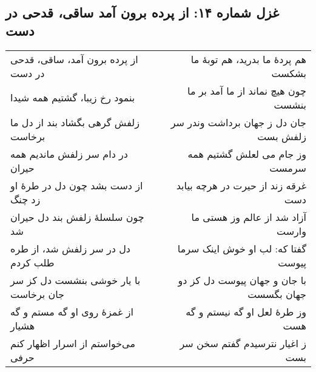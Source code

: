 \begin{center}
\section*{غزل شماره ۱۴: از پرده برون آمد ساقی، قدحی در دست}
\label{sec:014}
\begin{longtable}{l p{0.5cm} r}
از پرده برون آمد، ساقی، قدحی در دست
&&
هم پردهٔ ما بدرید، هم توبهٔ ما بشکست
\\
بنمود رخ زیبا، گشتیم همه شیدا
&&
چون هیچ نماند از ما آمد بر ما بنشست
\\
زلفش گرهی بگشاد بند از دل ما برخاست
&&
جان دل ز جهان برداشت وندر سر زلفش بست
\\
در دام سر زلفش ماندیم همه حیران
&&
وز جام می لعلش گشتیم همه سرمست
\\
از دست بشد چون دل در طرهٔ او زد چنگ
&&
غرقه زند از حیرت در هرچه بیابد دست
\\
چون سلسلهٔ زلفش بند دل حیران شد
&&
آزاد شد از عالم وز هستی ما وارست
\\
دل در سر زلفش شد، از طره طلب کردم
&&
گفتا که: لب او خوش اینک سرما پیوست
\\
با یار خوشی بنشست دل کز سر جان برخاست
&&
با جان و جهان پیوست دل کز دو جهان بگسست
\\
از غمزهٔ روی او گه مستم و گه هشیار
&&
وز طرهٔ لعل او گه نیستم و گه هست
\\
می‌خواستم از اسرار اظهار کنم حرفی
&&
ز اغیار نترسیدم گفتم سخن سر بست
\\
\end{longtable}
\end{center}
